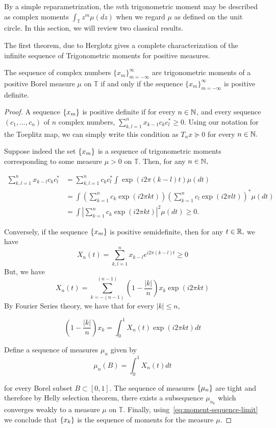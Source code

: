 By a simple reparametrization, the $m$th trigonometric moment may be described
as complex moments $\int_\mathbb{T} z^m \mu(dz)$ when we regard $\mu$ as defined
on the unit circle. In this section, we will review two classical results. 

The first theorem, due to Herglotz gives a complete characterization of the
infinite sequence of Trigonometric moments for positive measures. 
\begin{theorem}\label{thm:herglotz}
	The sequence of complex numbers $\{x_m\}_{m=-\infty}^{\infty}$ are
trigonometric moments of a positive Borel measure $\mu$ on $\mathbb{T}$ if and
only if the sequence $\{x_m\}_{m=-\infty}^{\infty}$ is positive definite.
\end{theorem}

\begin{proof}

A sequence $\left\{ x_m \right\}$ is positive definite if for every $n \in \mathbb{N}$, and every
sequence $(c_1, \ldots, c_n)$ of $n$ complex numbers, $\sum_{k,l=1}^n x_{k-1}
c_k c_l^* \geq 0.$ Using our notation for the Toeplitz map, we can simply write
this condition as $T_n x \succeq 0$ for every $n \in \mathbb{N}.$

Suppose indeed the set $\left\{ x_m \right\}$ is a sequence of trigonometric moments
corresponding to some measure $\mu > 0$ on $\mathbb{T}.$ Then, for any $n \in
\mathbb{N},$

\begin{align*}
	\sum_{k,l=1}^n x_{k-l} c_k c_l^* &= \sum_{k,l=1}^n c_k c_l^* \int \exp(i 2 \pi (k-l) t ) \mu (dt)\\
	&= \int \left(\sum_{k=1}^n c_k \exp(i 2 \pi k t) \right) \left(\sum_{k=1}^n c_l \exp(i 2 \pi l t) \right)^* \mu (dt) \\
	&= \int \left|\sum_{k=1}^n c_k \exp(i 2 \pi k t) \right|^2 \mu (dt) \geq 0.
\end{align*}

Conversely, if the sequence $\left\{ x_m \right\}$ is positive semidefinite, then for any $t \in \mathbb{R},$  we have
\[
X_n(t) = \sum_{k,l=1}^n x_{k-l} e^{i 2 \pi (k-l) t} \geq 0
\]
But, we have
\[
	X_n(t) = \sum_{k=-(n-1)}^{(n-1)} \left( 1 - \frac{|k|}{n}\right) x_k \exp(i 2\pi k t)
\]
By Fourier Series theory, we have that for every $|k| \leq n,$

\begin{equation}
	\label{eq:moment-sequence-limit}
	\left( 1 - \frac{|k|}{n} \right) x_k = \int_0^1 X_n(t) \exp(i 2\pi k t ) d t
\end{equation}

Define a sequence of measures $\mu_n$ given by
\[
	\mu_n(B) = \int_0^1 X_n(t) d t
\]

for every Borel subset $B \subset [0,1].$ The sequence of measures $\left\{ \mu_n \right\}$
are tight and therefore by Helly selection theorem, there exists a subsequence
$\mu_{n_k}$ which converges weakly to a measure $\mu$ on $\mathbb{T}.$ Finally, using~\ref{eq:moment-sequence-limit} we conclude that $\left\{ x_k \right\}$ is the sequence of moments for the measure $\mu.$
\end{proof}

